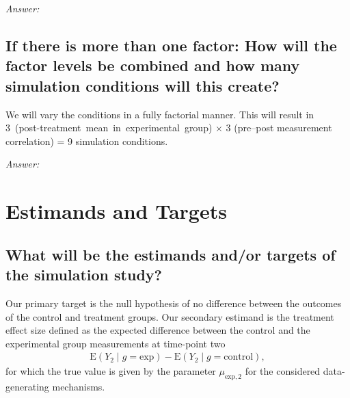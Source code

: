 \documentclass[12pt]{article}
\begin{document}
\textit{Answer:}

\subsection{If there is more than one factor: How will the factor levels be combined and how many simulation conditions will this create?} 

    
\begin{examplebox}
We will vary the conditions in a fully factorial manner. This will result in\\ \mbox{3 (post-treatment mean in experimental group)} $\times$ 3 (pre--post measurement correlation) = 9 simulation conditions.
\end{examplebox} 

\textit{Answer:}


\section{Estimands and Targets}
\subsection{What will be the estimands and/or targets of the simulation study?}      

    
\begin{examplebox}
Our primary target is the null hypothesis of no difference between the outcomes of the control and treatment groups. Our secondary estimand is the treatment effect size defined as the expected difference between the control and the experimental group measurements at time-point two
\begin{align*}
    \text{E}(Y_2 \mid g=\text{exp}) - \text{E}(Y_2 \mid g=\text{control}),
\end{align*}
for which the true value is given by the parameter $\mu_{\text{exp},2}$ for the considered data-generating mechanisms. 
\end{examplebox}  
\end{document}
